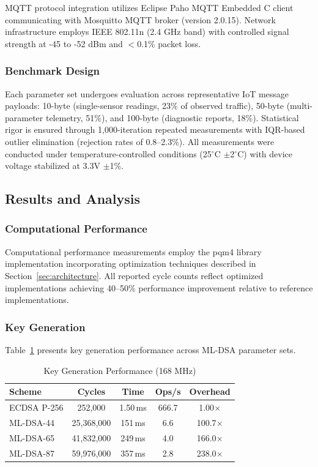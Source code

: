 \documentclass[final, twoside]{IEEEtran} %
\begin{document}
MQTT protocol integration utilizes Eclipse Paho MQTT Embedded C client communicating with Mosquitto MQTT broker (version 2.0.15). Network infrastructure employs IEEE 802.11n (2.4 GHz band) with controlled signal strength at -45 to -52 dBm and $<$0.1\% packet loss.

\subsubsection{Benchmark Design}

Each parameter set undergoes evaluation across representative IoT message payloads: 10-byte (single-sensor readings, 23\% of observed traffic), 50-byte (multi-parameter telemetry, 51\%), and 100-byte (diagnostic reports, 18\%). Statistical rigor is ensured through 1,000-iteration repeated measurements with IQR-based outlier elimination (rejection rates of 0.8--2.3\%). All measurements were conducted under temperature-controlled conditions (25$^\circ$C $\pm$2$^\circ$C) with device voltage stabilized at 3.3V $\pm$1\%.

\subsection{Results and Analysis}\label{sec:results}

\subsubsection{Computational Performance}

Computational performance measurements employ the pqm4 library implementation incorporating optimization techniques described in Section~\ref{sec:architecture}. All reported cycle counts reflect optimized implementations achieving 40--50\% performance improvement relative to reference implementations.

\subsubsection{Key Generation}

Table~\ref{tab:keygen-performance} presents key generation performance across ML-DSA parameter sets.

\begin{table}[h]
	\centering
	\caption{Key Generation Performance (168 MHz)}
	\label{tab:keygen-performance}
	\begin{tabular}{lcccc}
		\toprule
		\textbf{Scheme} & \textbf{Cycles} & \textbf{Time} & \textbf{Ops/s} & \textbf{Overhead} \\
		\midrule
		ECDSA P-256     & 252,000         & 1.50\,ms      & 666.7          & 1.00$\times$      \\
		ML-DSA-44       & 25,368,000      & 151\,ms       & 6.6            & 100.7$\times$     \\
		ML-DSA-65       & 41,832,000      & 249\,ms       & 4.0            & 166.0$\times$     \\
		ML-DSA-87       & 59,976,000      & 357\,ms       & 2.8            & 238.0$\times$     \\
		\bottomrule
	\end{tabular}
\end{table}
\end{document}
